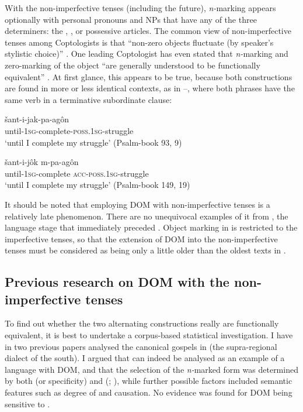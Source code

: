 \documentclass[output=paper]{LSP/langsci}
\begin{document}
With the non-imperfective tenses (including the future), \textit{n-}marking appears optionally with personal pronouns and NPs that have any of the three determiners: the , , or possessive articles. The common view of non-imperfective tenses among Coptologists is that “non-zero objects fluctuate (by speaker’s stylistic choice)” \citep[132]{Layton2000Coptic}. One leading Coptologist has even stated that \textit{n-}marking and zero-marking of the object “are generally understood to be functionally equivalent” \citep[41]{Emmel2006Coptic}. At first glance, this appears to be true, because both constructions are found in more or less identical contexts, as in –, where both phrases have the same verb in a terminative subordinate clause:

\begin{exe}
\ex \label{06-en:ex:13}
\begin{xlist}
\ex \label{06-en:ex:13a}
\gll šant-i-jak-pa-agôn\\
	until-\textsc{1sg-}complete-\textsc{poss.1sg-}struggle\\
\glt ‘until I complete my struggle’ (Psalm-book 93, 9)

\ex\label{06-en:ex:13b}
\gll šant-i-jôk 				m-pa-agôn\\
	until-\textsc{1sg-}complete \textsc{acc-}\textsc{poss.1sg-}struggle\\
\glt ‘until I complete my struggle’ (Psalm-book 149, 19)
\end{xlist}
\end{exe}

It should be noted that employing DOM with non-imperfective tenses is a relatively late phenomenon. There are no unequivocal examples of it from , the language stage that immediately preceded . Object marking in  is restricted to the imperfective tenses, so that the extension of DOM into the non-imperfective tenses must be considered as being only a little older than the oldest texts in .

\subsection{Previous research on DOM with the non-imperfective tenses}
\label{06-en-sec:2-3}

To find out whether the two alternating constructions really are functionally equivalent, it is best to undertake a corpus-based statistical investigation. 
I have in two previous papers \citep{Engsheden2006Koptischen,Engsheden2008Differential} analysed the canonical gospels in   (the supra-regional dialect of the south). I argued that  can indeed be analysed as an example of a language with DOM, and that the selection of the \textit{n-}marked form was determined by both  (or specificity) and  (\citealt[209–212]{Engsheden2006Koptischen}; \citealt[329–335]{Engsheden2008Differential}), while further possible factors included semantic features such as degree of  and causation. No evidence was found for  DOM being sensitive to .
\end{document}
